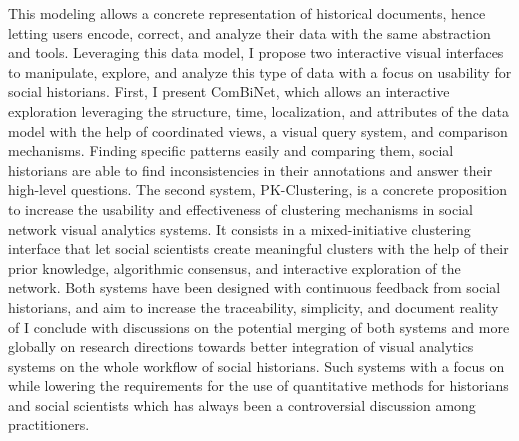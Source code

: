 {%
    This modeling allows a concrete representation of historical documents, hence letting users encode, correct, and analyze their data with the same abstraction and tools.
    Leveraging this data model, I propose two interactive visual interfaces to manipulate, explore, and analyze this type of data with a focus on usability for social historians.
    First, I present ComBiNet, which allows an interactive exploration leveraging the structure, time, localization, and attributes of the data model with the help of coordinated views, a visual query system, and comparison mechanisms.
    Finding specific patterns easily and comparing them, social historians are able to find inconsistencies in their annotations and answer their high-level questions.
    The second system, PK-Clustering, is a concrete proposition to increase the usability and effectiveness of clustering mechanisms in social network visual analytics systems. It consists in a mixed-initiative clustering interface that let social scientists create meaningful clusters with the help of their prior knowledge, algorithmic consensus, and interactive exploration of the network.
    Both systems have been designed with continuous feedback from social historians, and aim to increase the traceability, simplicity, and document reality of
    I conclude with discussions on the potential merging of both systems and more globally on research directions towards better integration of visual analytics systems on the whole workflow of social historians.
    Such systems with a focus on  while lowering the requirements for the use of quantitative methods for historians and social scientists which has always been a controversial discussion among practitioners.
}

